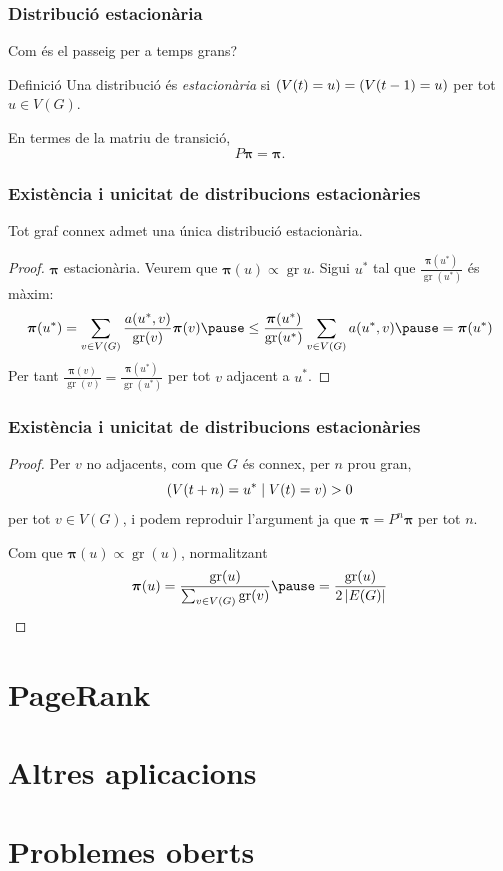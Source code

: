 \documentclass[aspectratio=169, 12pt]{beamer}
\let\P\relax
\DeclareMathOperator{\P}{P}
\renewcommand{\vec}[1]{\mathbf{\bm #1}}
\DeclareMathOperator{\gr}{gr}
\newcommand{\abs}[1]{\left\lvert #1 \right\rvert}
\begin{document}
\begin{frame}
	\frametitle{Distribució estacionària}
	Com és el passeig per a temps grans? \pause

	\begin{block}{Definició}
		Una distribució és \emph{estacionària} si \( \P(V(t) = u) = \P(V(t - 1) = u) \) per tot \( u \in V(G) \).
	\end{block} \pause

	En termes de la matriu de transició, \[ P\vec{\pi} = \vec{\pi}. \]
\end{frame}

\begin{frame}
	\frametitle{Existència i unicitat de distribucions estacionàries}
	\begin{theorem}
		Tot graf connex admet una única distribució estacionària.
	\end{theorem}
	\pause

	\begin{proof}
		\( \vec{\pi} \) estacionària. Veurem que \( \vec{\pi}(u) \propto \gr{u} \). \pause Sigui \( u^\ast \) tal que \( \frac{\vec{\pi}(u^\ast)}{\gr(u^\ast)} \) és màxim: \pause 
		\begin{equation*}
			\vec{\pi}(u^\ast) = \sum_{v \in V(G)} \frac{a(u^\ast,v)}{\gr(v)} \vec{\pi}(v) \pause \leq \frac{\vec{\pi}(u^\ast)}{\gr(u^\ast)} \sum_{v \in V(G)} a(u^{\ast},v) \pause = \vec{\pi}(u^\ast)
		\end{equation*}
		Per tant \( \frac{\vec{\pi}(v)}{\gr(v)} = \frac{\vec{\pi}(u^\ast)}{\gr(u^\ast)} \) per tot \( v \) adjacent a \( u^\ast \). 
	\end{proof}
\end{frame}

\begin{frame}
	\frametitle{Existència i unicitat de distribucions estacionàries}
	\begin{proof}
		Per \( v \) no adjacents, com que \( G \) és connex, per \( n \) prou gran, \[ \P(V(t + n) = u^\ast \mid V(t) = v) > 0 \] per tot \( v \in V(G) \), i podem reproduir l'argument ja que \( \vec{\pi} = P^n \vec{\pi} \) per tot \( n \). \pause

		Com que \( \vec{\pi}(u) \propto \gr(u) \), normalitzant
		\begin{equation*}
			\vec{\pi}(u) = \frac{\gr(u)}{\sum_{v \in V(G)} \gr(v)} \pause = \frac{\gr(u)}{2 \abs{E(G)}}
		\end{equation*}

	\end{proof}
\end{frame}
\section{PageRank}

\section{Altres aplicacions}

\section{Problemes oberts}
\end{document}
